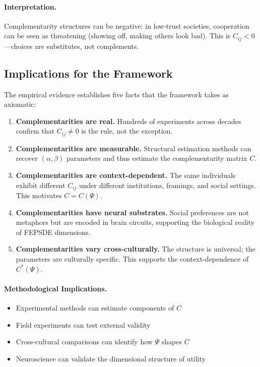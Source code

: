 \documentclass[12pt,a4paper]{article}
\begin{document}
\paragraph{Interpretation.}
Complementarity structures can be negative: in low-trust societies,
cooperation can be seen as threatening (showing off, making others look bad).
This is $C_{ij} < 0$---choices are substitutes, not complements.

\subsection{Implications for the Framework}

The empirical evidence establishes five facts that the framework takes as axiomatic:

\begin{enumerate}
  \item \textbf{Complementarities are real.}
        Hundreds of experiments across decades confirm that $C_{ij} \neq 0$
        is the rule, not the exception.

  \item \textbf{Complementarities are measurable.}
        Structural estimation methods can recover $(\alpha, \beta)$ parameters
        and thus estimate the complementarity matrix $C$.

  \item \textbf{Complementarities are context-dependent.}
        The same individuals exhibit different $C_{ij}$ under different
        institutions, framings, and social settings.
        This motivates $C = C(\Psi)$.

  \item \textbf{Complementarities have neural substrates.}
        Social preferences are not metaphors but are encoded in brain circuits,
        supporting the biological reality of FEPSDE dimensions.

  \item \textbf{Complementarities vary cross-culturally.}
        The structure is universal; the parameters are culturally specific.
        This supports the context-dependence of $C^*(\Psi)$.
\end{enumerate}

\paragraph{Methodological Implications.}
\begin{itemize}
  \item Experimental methods can estimate components of $C$
  \item Field experiments can test external validity
  \item Cross-cultural comparisons can identify how $\Psi$ shapes $C$
  \item Neuroscience can validate the dimensional structure of utility
\end{itemize}
\end{document}
